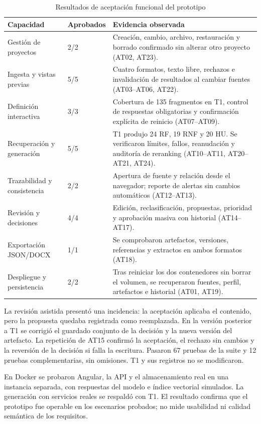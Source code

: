 \begin{table}[H]
  \centering
  \caption{Resultados de aceptación funcional del prototipo}
  \label{tab:resultados-pruebas}
  \small
  \begin{tabularx}{\textwidth}{p{4.0cm}p{1.9cm}Y}
    \toprule
    Capacidad & Aprobados & Evidencia observada \\
    \midrule
    Gestión de proyectos & 2/2 & Creación, cambio, archivo, restauración y borrado confirmado sin alterar otro proyecto (AT02, AT23). \\
    Ingesta y vistas previas & 5/5 & Cuatro formatos, texto libre, rechazos e invalidación de resultados al cambiar fuentes (AT03--AT06, AT22). \\
    Definición interactiva & 3/3 & Cobertura de 135 fragmentos en T1, control de respuestas obligatorias y confirmación explícita de reinicio (AT07--AT09). \\
    Recuperación y generación & 5/5 & T1 produjo 24 RF, 19 RNF y 20 HU. Se verificaron límites, fallos, reanudación y auditoría de reranking (AT10--AT11, AT20--AT21, AT24). \\
    Trazabilidad y consistencia & 2/2 & Apertura de fuente y relación desde el navegador; reporte de alertas sin cambios automáticos (AT12--AT13). \\
    Revisión y decisiones & 4/4 & Edición, reclasificación, propuestas, prioridad y aprobación masiva con historial (AT14--AT17). \\
    Exportación JSON/DOCX & 1/1 & Se comprobaron artefactos, versiones, referencias y extractos en ambos formatos (AT18). \\
    Despliegue y persistencia & 2/2 & Tras reiniciar los dos contenedores sin borrar el volumen, se recuperaron fuentes, perfil, artefactos e historial (AT01, AT19). \\
    \bottomrule
  \end{tabularx}
\end{table}

La revisión asistida presentó una incidencia: la aceptación aplicaba el contenido, pero la propuesta quedaba registrada como reemplazada. En la versión posterior a T1 se corrigió el guardado conjunto de la decisión y la nueva versión del artefacto. La repetición de AT15 confirmó la aceptación, el rechazo sin cambios y la reversión de la decisión si falla la escritura. Pasaron 67 pruebas de la suite y 12 pruebas complementarias, sin omisiones. T1 y sus registros no se modificaron.

En Docker se probaron Angular, la API y el almacenamiento real en una instancia separada, con respuestas del modelo e índice vectorial simulados. La generación con servicios reales se respaldó con T1. El resultado confirma que el prototipo fue operable en los escenarios probados; no mide usabilidad ni calidad semántica de los requisitos.

